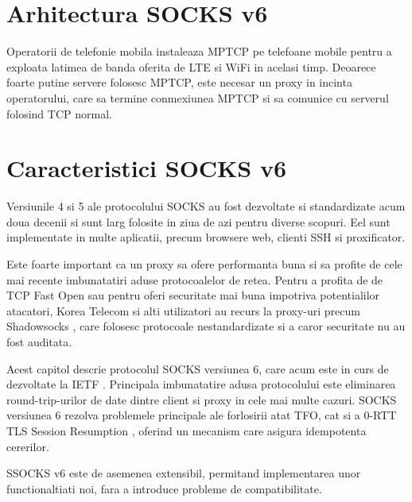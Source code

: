\chapter{Arhitectura SOCKS v6}
\label{sec:arch_upb}


Operatorii de telefonie mobila instaleaza MPTCP \cite{Raiciu_Hard:2012} pe telefoane mobile 
pentru a exploata latimea de banda oferita de LTE si WiFi in acelasi timp. Deoarece foarte putine
servere folosesc MPTCP, este necesar un proxy in incinta operatorului, care sa termine conmexiunea
MPTCP si sa comunice cu serverul folosind TCP normal.


\chapter{Caracteristici SOCKS v6}
\label{sec:arch_upb}

Versiunile 4 si 5 \cite{rfc1928} ale protocolului SOCKS au fost dezvoltate si standardizate acum
doua decenii si sunt larg folosite in ziua de azi pentru diverse scopuri.
Eel sunt implementate in multe aplicatii, precum browsere web, clienti SSH si proxificator.

Este foarte important ca un proxy sa ofere performanta buna si sa profite de cele mai recente
imbunatatiri aduse protocoalelor de retea. Pentru a profita de de TCP Fast Open \cite{rfc7413}
sau pentru oferi securitate mai buna impotriva potentialilor atacatori, Korea Telecom si alti utilizatori
au recurs la proxy-uri precum Shadowsocks \cite{shadowsocks}, care folosesc protocoale nestandardizate
si a caror securitate nu au fost auditata.

Acest capitol descrie protocolul SOCKS versiunea 6, care acum este in curs de dezvoltate la IETF \cite{olteanu-intarea-socks-6-02}.
Principala imbunatatire adusa protocolului este eliminarea round-trip-urilor de date dintre client si proxy in cele mai multe cazuri.
SOCKS versiunea 6 rezolva problemele principale ale forlosirii atat TFO, cat si a 0-RTT TLS Session Resumption \cite{tls1.3},
oferind un mecanism care asigura idempotenta cererilor.

SSOCKS v6 este de asemenea extensibil, permitand implementarea unor functionaltiati noi, fara a introduce probleme de compatibilitate.

